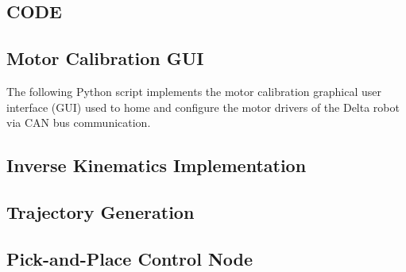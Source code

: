 \begin{appendices}
\section{\centering CODE}

\subsection*{Motor Calibration GUI}
\hspace{1.27cm}
The following Python script implements the motor calibration graphical user interface (GUI) used to home and configure the motor drivers of the Delta robot via CAN bus communication.
% 

\subsection*{Inverse Kinematics Implementation}
\hspace{1.27cm}
% 

\subsection*{Trajectory Generation}
\hspace{1.27cm}
% 

\subsection*{Pick-and-Place Control Node}
\hspace{1.27cm}
% 

\end{appendices}
